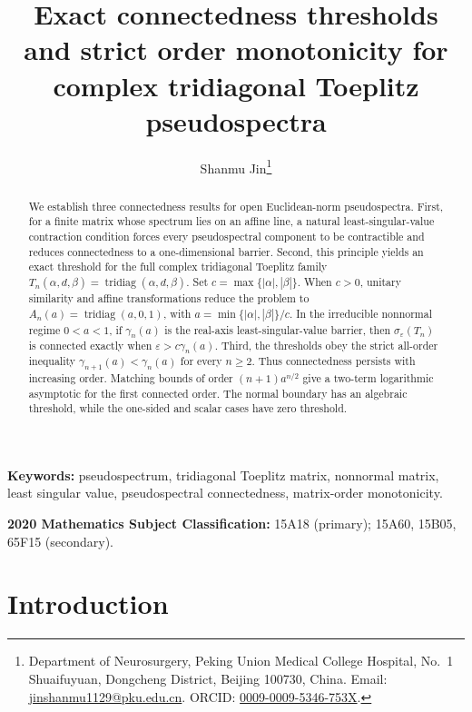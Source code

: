 \documentclass[11pt,a4paper]{article}
\numberwithin{equation}{section}
\DeclareMathOperator{\tridiag}{tridiag}
\newcommand{\Title}{Exact connectedness thresholds and strict order
monotonicity for complex tridiagonal Toeplitz pseudospectra}
\begin{document}
\title{\Title}
\author{Shanmu Jin\thanks{Department of Neurosurgery, Peking Union Medical
College Hospital, No.~1 Shuaifuyuan, Dongcheng District, Beijing 100730,
China. Email: \href{mailto:jinshanmu1129@pku.edu.cn}{jinshanmu1129@pku.edu.cn}.
ORCID: \href{https://orcid.org/0009-0009-5346-753X}{0009-0009-5346-753X}.}}
\date{}
\maketitle

\begin{abstract}
We establish three connectedness results for open Euclidean-norm
pseudospectra.  First, for a finite matrix whose spectrum lies on an affine
line, a natural least-singular-value contraction condition forces every
pseudospectral component to be contractible and reduces connectedness to a
one-dimensional barrier.  Second, this principle yields an exact threshold
for the full complex tridiagonal Toeplitz family
\(T_n(\alpha,d,\beta)=\tridiag(\alpha,d,\beta)\).  Set
\(c=\max\{|\alpha|,|\beta|\}\).  When \(c>0\), unitary similarity and affine
transformations reduce the problem to
\(A_n(a)=\tridiag(a,0,1)\), with
\(a=\min\{|\alpha|,|\beta|\}/c\).  In the irreducible nonnormal regime
\(0<a<1\), if \(\gamma_n(a)\) is the real-axis least-singular-value barrier,
then \(\sigma_\varepsilon(T_n)\) is connected exactly when
\(\varepsilon>c\gamma_n(a)\).  Third, the thresholds obey the strict
all-order inequality \(\gamma_{n+1}(a)<\gamma_n(a)\) for every \(n\geq2\).
Thus connectedness persists with increasing order.  Matching bounds of order
\((n+1)a^{n/2}\) give a two-term logarithmic asymptotic for the first
connected order.  The normal boundary has an algebraic threshold, while the
one-sided and scalar cases have zero threshold.
\end{abstract}

\medskip
\noindent\textbf{Keywords:}
pseudospectrum, tridiagonal Toeplitz matrix, nonnormal matrix, least singular
value, pseudospectral connectedness, matrix-order monotonicity.

\smallskip
\noindent\textbf{2020 Mathematics Subject Classification:}
15A18 (primary); 15A60, 15B05, 65F15 (secondary).

\section{Introduction}\label{sec:introduction}
\end{document}
